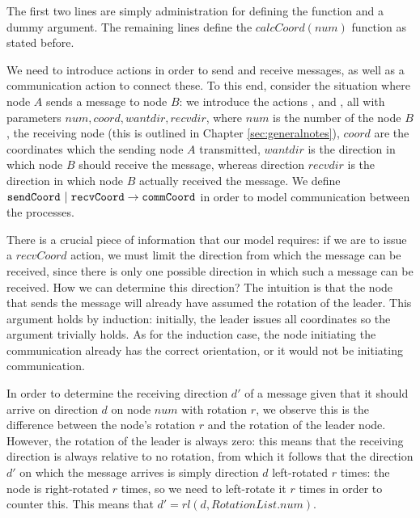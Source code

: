 The first two lines are simply administration for defining the function and a dummy argument. The remaining lines define the $calcCoord(num)$ function as stated before.

We need to introduce actions in order to send and receive messages, as well as a communication action to connect these. To this end, consider the situation where node $A$ sends a message to node $B$: we introduce the actions ,  and , all with parameters $num,coord,wantdir,recvdir$, where $num$ is the number of the node $B$, the receiving node (this is outlined in Chapter \ref{sec:generalnotes}), $coord$ are the coordinates which the sending node $A$ transmitted, $wantdir$ is the direction in which node $B$ should receive the message, whereas direction $recvdir$ is the direction in which node $B$ actually received the message. We define $\texttt{sendCoord} ~|~ \texttt{recvCoord} \rightarrow \texttt{commCoord}$ in order to model communication between the processes.

There is a crucial piece of information that our model requires: if we are to issue a $recvCoord$ action, we must limit the direction from which the message can be received, since there is only one possible direction in which such a message can be received. How we can determine this direction? The intuition is that the node that sends the message will already have assumed the rotation of the leader. This argument holds by induction: initially, the leader issues all coordinates so the argument trivially holds. As for the induction case, the node initiating the communication already has the correct orientation, or it would not be initiating communication.

In order to determine the receiving direction $d'$ of a message given that it should arrive on direction $d$ on node $num$ with rotation $r$, we observe this is the difference between the node's rotation $r$ and the rotation of the leader node. However, the rotation of the leader is always zero: this means that the receiving direction is always relative to no rotation, from which it follows that the direction $d'$ on which the message arrives is simply direction $d$ left-rotated $r$ times: the node is right-rotated $r$ times, so we need to left-rotate it $r$ times in order to counter this. This means that $d' = rl(d,RotationList.num)$.

